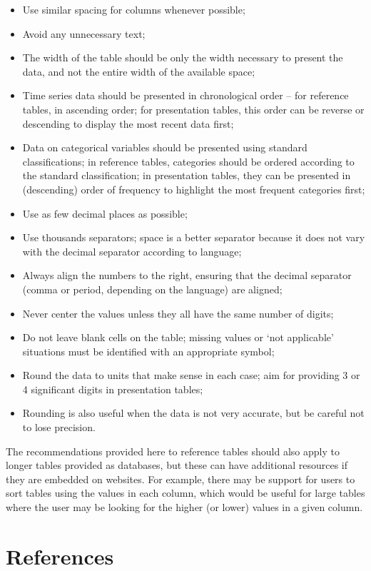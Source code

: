 \documentclass[
  12pt,
]{book}
\providecommand{\tightlist}{%
  \setlength{\itemsep}{0pt}\setlength{\parskip}{0pt}}
\begin{document}
\begin{itemize}
\tightlist
\item
  Use similar spacing for columns whenever possible;
\item
  Avoid any unnecessary text;
\item
  The width of the table should be only the width necessary to present the data, and not the entire width of the available space;
\item
  Time series data should be presented in chronological order -- for reference tables, in ascending order; for presentation tables, this order can be reverse or descending to display the most recent data first;
\item
  Data on categorical variables should be presented using standard classifications; in reference tables, categories should be ordered according to the standard classification; in presentation tables, they can be presented in (descending) order of frequency to highlight the most frequent categories first;
\item
  Use as few decimal places as possible;
\item
  Use thousands separators; space is a better separator because it does not vary with the decimal separator according to language;
\item
  Always align the numbers to the right, ensuring that the decimal separator (comma or period, depending on the language) are aligned;
\item
  Never center the values unless they all have the same number of digits;
\item
  Do not leave blank cells on the table; missing values or `not applicable' situations must be identified with an appropriate symbol;
\item
  Round the data to units that make sense in each case; aim for providing 3 or 4 significant digits in presentation tables;
\item
  Rounding is also useful when the data is not very accurate, but be careful not to lose precision.
\end{itemize}

The recommendations provided here to reference tables should also apply to longer tables provided as databases, but these can have additional resources if they are embedded on websites. For example, there may be support for users to sort tables using the values in each column, which would be useful for large tables where the user may be looking for the higher (or lower) values in a given column.

\hypertarget{references}{%
\chapter*{References}\label{references}}

  
\end{document}
